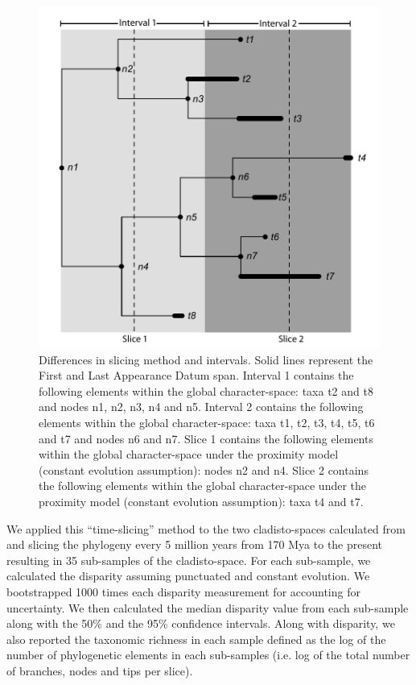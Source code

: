 \documentclass[12pt,letterpaper]{article}
\begin{document}
\begin{figure}[!htbp]
\centering
    \includegraphics[keepaspectratio=true]{Figures/Slicing.pdf}
\caption{Differences in slicing method and intervals. Solid lines represent the First and Last Appearance Datum span. Interval 1 contains the following elements within the global character-space: taxa t2 and t8 and nodes n1, n2, n3, n4 and n5. Interval 2 contains the following elements within the global character-space: taxa t1, t2, t3, t4, t5, t6 and t7 and nodes n6 and n7. Slice 1 contains the following elements within the global character-space under the proximity model (constant evolution assumption): nodes n2 and n4. Slice 2 contains the following elements within the global character-space under the proximity model (constant evolution assumption): taxa t4 and t7.}
\label{fig_slicing}
\end{figure}

We applied this ``time-slicing'' method to the two cladisto-spaces calculated from \cite{Slater2012MEE} and \cite{beckancient2014} slicing the phylogeny every 5 million years from 170 Mya to the present resulting in 35 sub-samples of the cladisto-space.
For each sub-sample, we calculated the disparity assuming punctuated and constant evolution.
We bootstrapped 1000 times each disparity measurement for accounting for uncertainty.
We then calculated the median disparity value from each sub-sample along with the 50\% and the 95\% confidence intervals.
Along with disparity, we also reported the taxonomic richness in each sample defined as the log of the number of phylogenetic elements in each sub-samples (i.e. log of the total number of branches, nodes and tips per slice).
\end{document}
